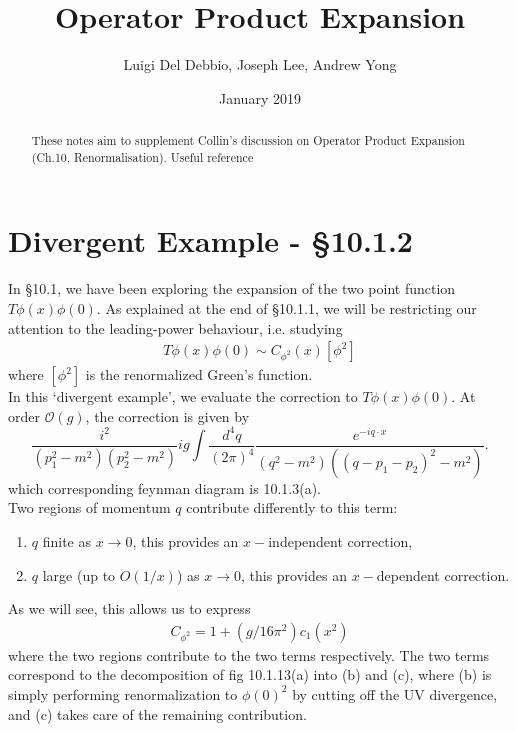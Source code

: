 \documentclass{article}
\title{Operator Product Expansion}
\author{Luigi Del Debbio, Joseph Lee, Andrew Yong}
\date{January 2019}
\begin{document}
\maketitle
\renewcommand{\abstractname}{\vspace{-\baselineskip}}
\begin{abstract}
These notes aim to supplement Collin's discussion on Operator Product Expansion (Ch.10, Renormalisation\cite{collins_1984}). Useful reference \cite{schwartz}
\end{abstract}

\section{Divergent Example - \S 10.1.2}
In \S10.1, we have been exploring the expansion of the two point function $T\phi(x)\phi(0)$. As explained at the end of \S10.1.1, we will be restricting our attention to the leading-power behaviour, i.e. studying
\begin{align*}
    T\phi(x)\phi(0) \sim C_{\phi^2}(x)[\phi^2]
\end{align*}
where $[\phi^2]$ is the renormalized Green's function. \\

In this `divergent example', we evaluate the correction to $T\phi(x)\phi(0)$. At order $\mathcal{O}(g)$, the correction is given by
\begin{equation}
    \frac{i^2}{(p_1^2-m^2)(p_2^2-m^2)}ig\int \frac{d^4q}{(2\pi)^4} \frac{e^{-iq\cdot x}}{(q^2-m^2)((q-p_1-p_2)^2 - m^2)}.
    \label{loopOg}
\end{equation}
which corresponding feynman diagram is 10.1.3(a).\\

Two regions of momentum $q$ contribute differently to this term:
\begin{enumerate}
    \item $q$ finite as $x \rightarrow 0$, this  provides an $x-$independent correction,
    \item $q$ large (up to $O(1/x)$) as $x \rightarrow 0$, this  provides an $x-$dependent correction.
\end{enumerate}
As we will see, this allows us to express 
\begin{align}
    C_{\phi^2} = 1 + (g/16\pi^2)c_1(x^2)
\end{align}
where the two regions contribute to the two terms respectively. The two terms correspond to the decomposition of fig  10.1.13(a) into (b) and (c), where (b) is simply performing renormalization to $\phi(0)^2$ by cutting off the UV divergence, and (c) takes care of the remaining contribution. 
\end{document}
